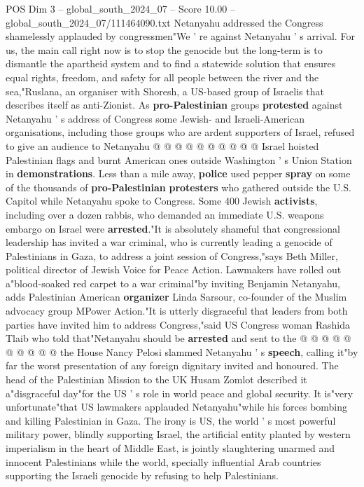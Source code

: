 \begin{textsample}{POS Dim 3 – global\_south\_2024\_07 – Score 10.00 – global\_south\_2024\_07/111464090.txt}
Netanyahu addressed the Congress shamelessly applauded by congressmen"We ' re against Netanyahu ' s arrival.
For us, the main call right now is to stop the genocide but the long-term is to dismantle the apartheid system and to find a statewide solution that ensures equal rights, freedom, and safety for all people between the river and the sea,"Ruslana, an organiser with Shoresh, a US-based group of Israelis that describes itself as anti-Zionist.
As \textbf{pro-Palestinian} groups \textbf{protested} against Netanyahu ' s address of Congress some Jewish- and Israeli-American organisations, including those groups who are ardent supporters of Israel, refused to give an audience to Netanyahu @ @ @ @ @ @ @ @ @ @ Israel hoisted Palestinian flags and burnt American ones outside Washington ' s Union Station in \textbf{demonstrations}.
Less than a mile away, \textbf{police} used pepper \textbf{spray} on some of the thousands of \textbf{pro-Palestinian} \textbf{protesters} who gathered outside the U.S.
Capitol while Netanyahu spoke to Congress.
Some 400 Jewish \textbf{activists}, including over a dozen rabbis, who demanded an immediate U.S. weapons embargo on Israel were \textbf{arrested}."It is absolutely shameful that congressional leadership has invited a war criminal, who is currently leading a genocide of Palestinians in Gaza, to address a joint session of Congress,"says Beth Miller, political director of Jewish Voice for Peace Action.
Lawmakers have rolled out a"blood-soaked red carpet to a war criminal"by inviting Benjamin Netanyahu, adds Palestinian American \textbf{organizer} Linda Sarsour, co-founder of the Muslim advocacy group MPower Action."It is utterly disgraceful that leaders from both parties have invited him to address Congress,"said US Congress woman Rashida Tlaib who told that"Netanyahu should be \textbf{arrested} and sent to the @ @ @ @ @ @ @ @ @ @ the House Nancy Pelosi slammed Netanyahu ' s \textbf{speech}, calling it"by far the worst presentation of any foreign dignitary invited and honoured.
The head of the Palestinian Mission to the UK Husam Zomlot described it a"disgraceful day"for the US ' s role in world peace and global security.
It is"very unfortunate"that US lawmakers applauded Netanyahu"while his forces bombing and killing Palestinian in Gaza.
The irony is US, the world ' s most powerful military power, blindly supporting Israel, the artificial entity planted by western imperialism in the heart of Middle East, is jointly slaughtering unarmed and innocent Palestinians while the world, specially influential Arab countries supporting the Israeli genocide by refusing to help Palestinians.

\end{textsample}
